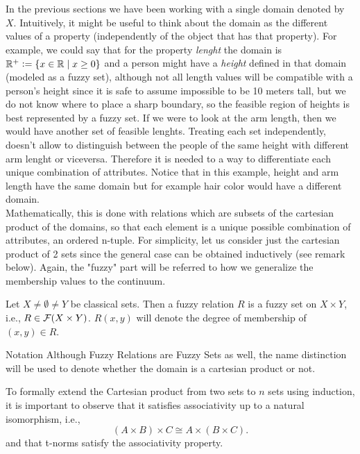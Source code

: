   In the previous sections we have been working with a single domain denoted by $X$. Intuitively, it might be useful to think about the domain as the different values of a property (independently of the object that has that property). For example, we could say that for the property \textit{lenght} the domain is $\mathbb{R}^+\mathrel{\mathop:}=
  \{x\in\mathbb{R} \mid x \geq 0\}$ and a person might have a \textit{height} defined in that domain (modeled as a fuzzy set), although not all length values will be compatible with a person's height since it is safe to assume impossible to be 10 meters tall, but we do not know where to place a sharp boundary, so the feasible region of heights is best represented by a fuzzy set. If we were to look at the arm length, then we would have another set of feasible lenghts. Treating each set independently, doesn't allow to distinguish between the people of the same height with different arm lenght or viceversa. Therefore it is needed to a way to differentiate each unique combination of attributes. Notice that in this example, height and arm length have the same domain but for example hair color would have a different domain.\\

  Mathematically, this is done with relations which are subsets of the cartesian product of the domains, so that each element is a unique possible combination of attributes, an ordered n-tuple. For simplicity, let us consider just the cartesian product of 2 sets since the general case can be obtained inductively (see remark below). Again, the "fuzzy" part will be referred to how we generalize the membership values to the continuum.


  \begin{definition}
    Let $X\neq \emptyset \neq Y$ be classical sets. Then a fuzzy relation $R$ is a fuzzy set on $X\times Y$, i.e., $R\in \mathcal{F}(X\times Y)$. $R(x,y)$ will denote the degree of membership of $(x,y) \in R$.
  \end{definition}

  \begin{notation}[label={not:compositionFS}]{Notation}
    Although Fuzzy Relations are Fuzzy Sets as well, the name distinction will be used to denote whether the domain is a cartesian product or not.
  \end{notation}

  \begin{remark}
    To formally extend the Cartesian product from two sets to \( n \) sets using induction, it is important to observe that it satisfies associativity up to a natural isomorphism, i.e., 
    \[
    (A\times B)\times C \cong A\times (B\times C).
    \]
    and that t-norms satisfy the associativity property.
  \end{remark}

